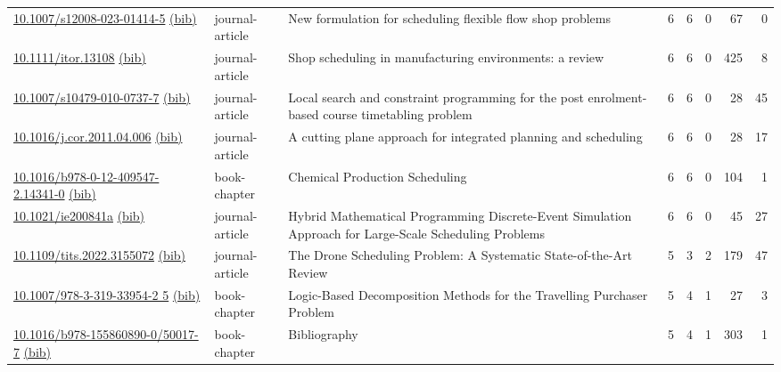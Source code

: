{\begin{longtable}{p{5cm}lp{11cm}rrrrr}
\href{http://dx.doi.org/10.1007/s12008-023-01414-5}{10.1007/s12008-023-01414-5} \href{https://www.doi2bib.org/bib/10.1007/s12008-023-01414-5}{(bib)} & journal-article & New formulation for scheduling flexible flow shop problems & 6 & 6 & 0 & 67 & 0 \\
\href{http://dx.doi.org/10.1111/itor.13108}{10.1111/itor.13108} \href{https://www.doi2bib.org/bib/10.1111/itor.13108}{(bib)} & journal-article & Shop scheduling in manufacturing environments: a review & 6 & 6 & 0 & 425 & 8 \\
\href{http://dx.doi.org/10.1007/s10479-010-0737-7}{10.1007/s10479-010-0737-7} \href{https://www.doi2bib.org/bib/10.1007/s10479-010-0737-7}{(bib)} & journal-article & Local search and constraint programming for the post enrolment-based course timetabling problem & 6 & 6 & 0 & 28 & 45 \\
\href{http://dx.doi.org/10.1016/j.cor.2011.04.006}{10.1016/j.cor.2011.04.006} \href{https://www.doi2bib.org/bib/10.1016/j.cor.2011.04.006}{(bib)} & journal-article & A cutting plane approach for integrated planning and scheduling & 6 & 6 & 0 & 28 & 17 \\
\href{http://dx.doi.org/10.1016/b978-0-12-409547-2.14341-0}{10.1016/b978-0-12-409547-2.14341-0} \href{https://www.doi2bib.org/bib/10.1016/b978-0-12-409547-2.14341-0}{(bib)} & book-chapter & Chemical Production Scheduling & 6 & 6 & 0 & 104 & 1 \\
\href{http://dx.doi.org/10.1021/ie200841a}{10.1021/ie200841a} \href{https://www.doi2bib.org/bib/10.1021/ie200841a}{(bib)} & journal-article & Hybrid Mathematical Programming Discrete-Event Simulation Approach for Large-Scale Scheduling Problems & 6 & 6 & 0 & 45 & 27 \\
\href{http://dx.doi.org/10.1109/tits.2022.3155072}{10.1109/tits.2022.3155072} \href{https://www.doi2bib.org/bib/10.1109/tits.2022.3155072}{(bib)} & journal-article & The Drone Scheduling Problem: A Systematic State-of-the-Art Review & 5 & 3 & 2 & 179 & 47 \\
\href{http://dx.doi.org/10.1007/978-3-319-33954-2_5}{10.1007/978-3-319-33954-2 5} \href{https://www.doi2bib.org/bib/10.1007/978-3-319-33954-2_5}{(bib)} & book-chapter & Logic-Based Decomposition Methods for the Travelling Purchaser Problem & 5 & 4 & 1 & 27 & 3 \\
\href{http://dx.doi.org/10.1016/b978-155860890-0/50017-7}{10.1016/b978-155860890-0/50017-7} \href{https://www.doi2bib.org/bib/10.1016/b978-155860890-0/50017-7}{(bib)} & book-chapter & Bibliography & 5 & 4 & 1 & 303 & 1 \\

\end{longtable}}
